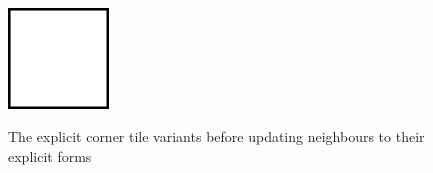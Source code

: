 \begin{figure}[H]
{\begin{minipage}[b]{0.22\linewidth}
            \includegraphics[width=0.2375\textwidth, height=0.1\textheight, keepaspectratio]{Images/CubeTile.png}
        \end{minipage}
        \label{fig:explicitNeighbourUpdate3}
    }
    \caption{The explicit corner tile variants before updating neighbours to their explicit forms}
    \label{fig:explicitNeighbourUpdate}
\end{figure}


